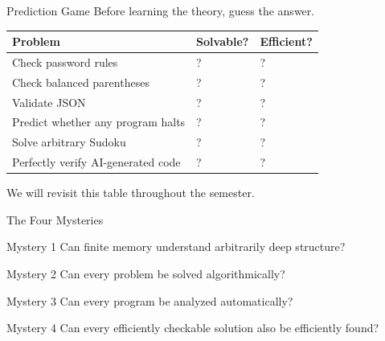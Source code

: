 \documentclass[10pt,aspectratio=169]{beamer}
\newcommand{\tagline}[1]{\begin{center}\alert{#1}\end{center}}
\begin{document}
\begin{frame}{Prediction Game}
Before learning the theory, guess the answer.

\vspace{0.7em}
\begin{center}
\begin{tabular}{lll}
\toprule
\textbf{Problem} & \textbf{Solvable?} & \textbf{Efficient?} \\
\midrule
Check password rules & ? & ? \\
Check balanced parentheses & ? & ? \\
Validate JSON & ? & ? \\
Predict whether any program halts & ? & ? \\
Solve arbitrary Sudoku & ? & ? \\
Perfectly verify AI-generated code & ? & ? \\
\bottomrule
\end{tabular}
\end{center}

\pause
\vspace{0.5em}
\tagline{We will revisit this table throughout the semester.}
\end{frame}

\begin{frame}{The Four Mysteries}
\begin{block}{Mystery 1}
Can finite memory understand arbitrarily deep structure?
\end{block}

\begin{block}{Mystery 2}
Can every problem be solved algorithmically?
\end{block}

\begin{block}{Mystery 3}
Can every program be analyzed automatically?
\end{block}

\begin{block}{Mystery 4}
Can every efficiently checkable solution also be efficiently found?
\end{block}
\end{frame}
\end{document}
